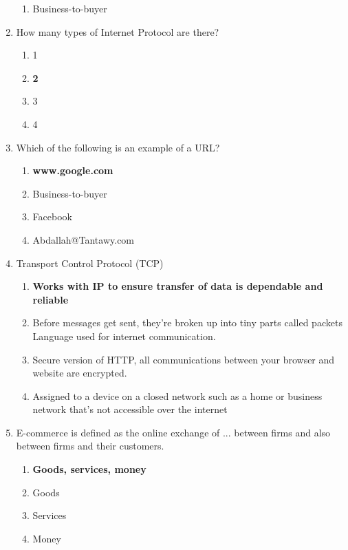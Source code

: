 \documentclass{article}
\begin{document}
\begin{enumerate}[label=\arabic*.]
\begin{enumerate}
            \item Business-to-buyer
        \end{enumerate}
    \item How many types of Internet Protocol are there?
        \begin{enumerate}
            \item 1
            \item \textbf{2}
            \item 3
            \item 4
        \end{enumerate}
    \item Which of the following is an example of a URL?
        \begin{enumerate}
            \item \textbf{www.google.com}
            \item Business-to-buyer
            \item Facebook
            \item Abdallah@Tantawy.com
        \end{enumerate}
    \item Transport Control Protocol (TCP)
        \begin{enumerate}
            \item \textbf{Works with IP to ensure transfer of data is dependable and reliable}
            \item Before messages get sent, they’re broken up into tiny parts called packets Language used for internet communication.
            \item Secure version of HTTP, all communications between your browser and website are encrypted.
            \item Assigned to a device on a closed network such as a home or business network that’s not accessible over the internet
        \end{enumerate}
    
    \item E-commerce is defined as the online exchange of ... between firms and also between firms and their customers.
        \begin{enumerate}
            \item \textbf{Goods, services, money}
            \item Goods
            \item Services
            \item Money
        \end{enumerate}
    

\end{enumerate}
\end{document}
